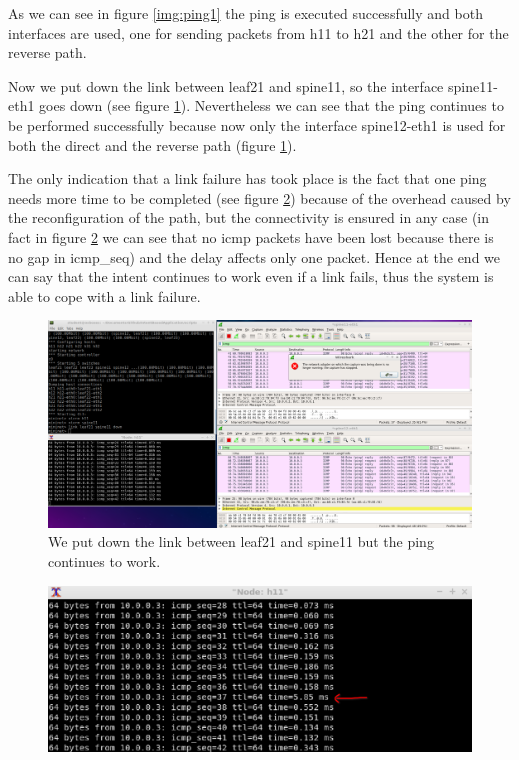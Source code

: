 \noindent As we can see in figure \ref{img:ping1} the ping is executed successfully and both interfaces are used, one for sending packets from h11 to h21 and the other for the reverse path.

\noindent Now we put down the link between leaf21 and spine11, so the interface spine11-eth1 goes down (see figure \ref{img:linkdown}). Nevertheless we can see that the ping continues to be performed successfully because now only the interface spine12-eth1 is used for both the direct and the reverse path (figure \ref{img:linkdown}).

\noindent The only indication that a link failure has took place is the fact that one ping needs more time to be completed (see figure \ref{img:ping_detail}) because of the overhead caused by the reconfiguration of the path, but the connectivity is ensured in any case (in fact in figure \ref{img:ping_detail} we can see that no icmp packets have been lost because there is no gap in icmp\_seq) and the delay affects only one packet. Hence at the end we can say that the intent continues to work even if a link fails, thus the system is able to cope with a link failure.

\begin{figure}[h]
	\centering
	\includegraphics[width=1\textwidth]{img/test2.png}
	\caption{We put down the link between leaf21 and spine11 but the ping continues to work.}
	\label{img:linkdown}
\end{figure}

\begin{figure}[h]
	\centering
	\includegraphics[width=1\textwidth]{img/ping_detail.png}
	\caption{}
	\label{img:ping_detail}
\end{figure}


